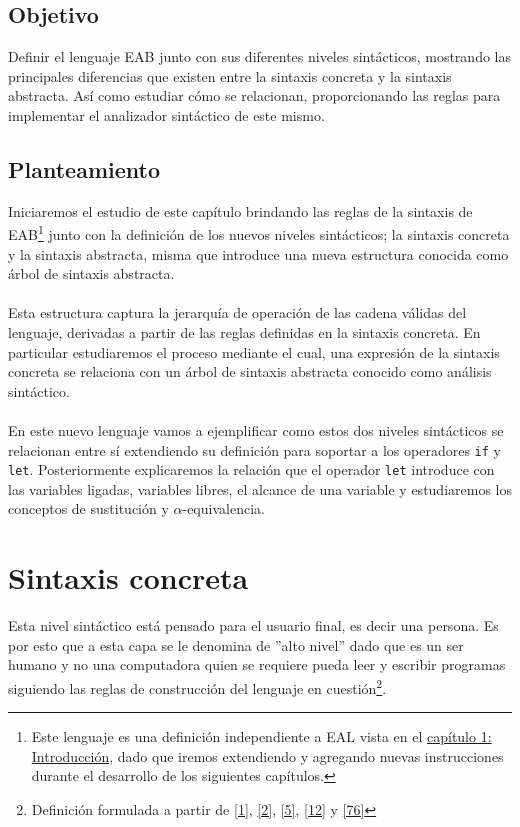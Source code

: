 \subsection*{Objetivo}
Definir el lenguaje \textsf{EAB} junto con sus diferentes niveles sintácticos, mostrando las principales diferencias que existen entre la sintaxis concreta y la sintaxis abstracta. Así como estudiar cómo se relacionan, proporcionando las reglas para implementar el analizador sintáctico de este mismo.

\subsection*{Planteamiento}
Iniciaremos el estudio de este capítulo brindando las reglas de la sintaxis de \textsf{EAB}\footnote{Este lenguaje es una definición independiente a \textsf{EAL} vista en el \hyperref[sec:intro]{capítulo 1: Introducción}, dado que iremos extendiendo y agregando nuevas instrucciones durante el desarrollo de los siguientes capítulos.} junto con la definición de los nuevos niveles sintácticos; la sintaxis concreta y la sintaxis abstracta, misma que introduce una nueva estructura conocida como árbol de sintaxis abstracta.\\\\
 Esta estructura captura la jerarquía de operación de las cadena válidas del lenguaje, derivadas a partir de las reglas definidas en la sintaxis concreta. En particular estudiaremos el proceso mediante el cual, una expresión de la sintaxis concreta se relaciona con un árbol de sintaxis abstracta conocido como análisis sintáctico. \\\\
En este nuevo lenguaje vamos a ejemplificar como estos dos niveles sintácticos se relacionan entre sí extendiendo su definición para soportar a los operadores \texttt{if} y \texttt{let}. 
Posteriormente explicaremos la relación que el operador \texttt{let} introduce con las variables ligadas, variables libres, el alcance de una variable y estudiaremos los conceptos de sustitución y $\alpha$-equivalencia.

\section{Sintaxis concreta}

    Esta nivel sintáctico está pensado para el usuario final, es decir una persona. Es por esto que a esta capa se le denomina de ''alto nivel'' dado que es un ser humano y no una computadora quien se requiere pueda leer y escribir programas siguiendo las reglas de construcción del lenguaje en cuestión\footnote{Definición formulada a partir de \hyperlink{1}{[1]}, \hyperlink{2}{[2]}, \hyperlink{5}{[5]}, \hyperlink{12}{[12]} y \hyperlink{76}{[76]}}.

